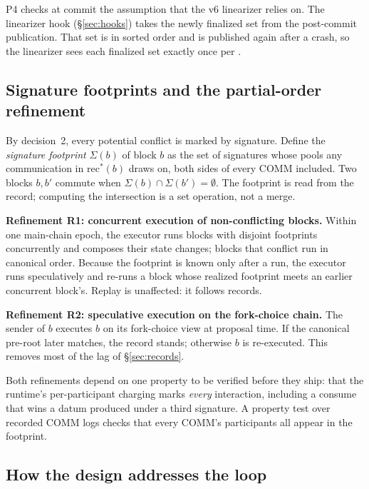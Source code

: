 \documentclass[11pt]{article}
\newcommand{\code}{\path}
\begin{document}
P4 checks at commit the assumption that the v6 linearizer relies on. The linearizer hook (\S\ref{sec:hooks}) takes the newly finalized set from the post-commit publication. That set is in sorted order and is published again after a crash, so the linearizer sees each finalized set exactly once per \code{commit_epoch}.

\subsection{Signature footprints and the partial-order refinement}\label{sec:footprint}

By decision~2, every potential conflict is marked by signature. Define the \emph{signature footprint} $\Sigma(b)$ of block $b$ as the set of signatures whose pools any communication in $\mathrm{rec}^*(b)$ draws on, both sides of every COMM included. Two blocks $b, b'$ commute when $\Sigma(b) \cap \Sigma(b') = \emptyset$. The footprint is read from the record; computing the intersection is a set operation, not a merge.

\textbf{Refinement R1: concurrent execution of non-conflicting blocks.} Within one main-chain epoch, the executor runs blocks with disjoint footprints concurrently and composes their state changes; blocks that conflict run in canonical order. Because the footprint is known only after a run, the executor runs speculatively and re-runs a block whose realized footprint meets an earlier concurrent block's. Replay is unaffected: it follows records.

\textbf{Refinement R2: speculative execution on the fork-choice chain.} The sender of $b$ executes $b$ on its fork-choice view at proposal time. If the canonical pre-root later matches, the record stands; otherwise $b$ is re-executed. This removes most of the lag of \S\ref{sec:records}.

Both refinements depend on one property to be verified before they ship: that the runtime's per-participant charging marks \emph{every} interaction, including a consume that wins a datum produced under a third signature. A property test over recorded COMM logs checks that every COMM's participants all appear in the footprint.

\subsection{How the design addresses the loop}
\end{document}
